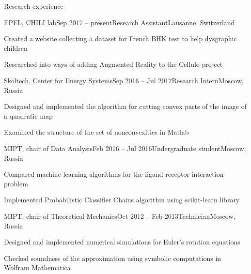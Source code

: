 \documentclass{resume} %
\begin{document}
\begin{rSection}{Research experience}
		\begin{rSubsection}{EPFL, CHILI lab}{Sep 2017 -- present}{Research Assistant}{Lausanne, Switzerland}
		\item Created a website collecting a dataset for French BHK test to help dysgraphic children
		\item Researched into ways of adding Augmented Reality to the Cellulo project
	\end{rSubsection}
	
	\begin{rSubsection}{Skoltech, Center for Energy Systems}{Sep 2016 -- Jul 2017}{Research Intern}{Moscow, Russia}
		\item Designed and implemented the algorithm for cutting convex parts of the image of a quadratic map
		\item Examined the structure of the set of nonconvexities in Matlab
	\end{rSubsection}
	
	\begin{rSubsection}{MIPT, chair of Data Analysis}{Feb 2016 -- Jul 2016}{Undergraduate student}{Moscow, Russia}
		\item Compared machine learning algorithms for the ligand-receptor interaction problem
		\item Implemented Probabilistic Classifier Chains algorithm using scikit-learn library
	\end{rSubsection}
	
	\begin{rSubsection}{MIPT, chair of Theoretical Mechanics}{Oct 2012 -- Feb 2013}{Technician}{Moscow, Russia}
		\item Designed and implemented numerical simulations for Euler's rotation equations
		\item Checked soundness of the approximation using symbolic computations in Wolfram Mathematica
	\end{rSubsection}
\end{rSection}
\end{document}
